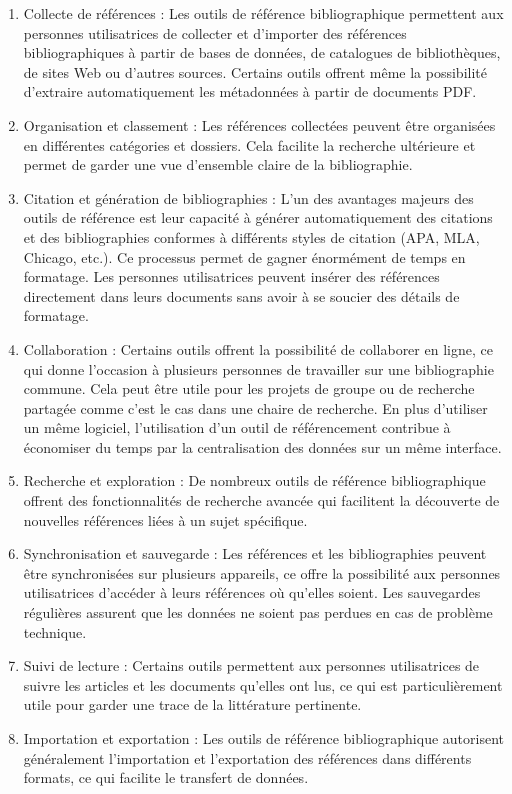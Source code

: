 \documentclass[
  letterpaper,
  DIV=11,
  numbers=noendperiod]{scrreprt}
\begin{document}
\begin{enumerate}
\def\labelenumi{\arabic{enumi}.}
\item
  Collecte de références : Les outils de référence bibliographique
  permettent aux personnes utilisatrices de collecter et d'importer des
  références bibliographiques à partir de bases de données, de
  catalogues de bibliothèques, de sites Web ou d'autres sources.
  Certains outils offrent même la possibilité d'extraire automatiquement
  les métadonnées à partir de documents PDF.
\item
  Organisation et classement : Les références collectées peuvent être
  organisées en différentes catégories et dossiers. Cela facilite la
  recherche ultérieure et permet de garder une vue d'ensemble claire de
  la bibliographie.
\item
  Citation et génération de bibliographies : L'un des avantages majeurs
  des outils de référence est leur capacité à générer automatiquement
  des citations et des bibliographies conformes à différents styles de
  citation (APA, MLA, Chicago, etc.). Ce processus permet de gagner
  énormément de temps en formatage. Les personnes utilisatrices peuvent
  insérer des références directement dans leurs documents sans avoir à
  se soucier des détails de formatage.
\item
  Collaboration : Certains outils offrent la possibilité de collaborer
  en ligne, ce qui donne l'occasion à plusieurs personnes de travailler
  sur une bibliographie commune. Cela peut être utile pour les projets
  de groupe ou de recherche partagée comme c'est le cas dans une chaire
  de recherche. En plus d'utiliser un même logiciel, l'utilisation d'un
  outil de référencement contribue à économiser du temps par la
  centralisation des données sur un même interface.
\item
  Recherche et exploration : De nombreux outils de référence
  bibliographique offrent des fonctionnalités de recherche avancée qui
  facilitent la découverte de nouvelles références liées à un sujet
  spécifique.
\item
  Synchronisation et sauvegarde : Les références et les bibliographies
  peuvent être synchronisées sur plusieurs appareils, ce offre la
  possibilité aux personnes utilisatrices d'accéder à leurs références
  où qu'elles soient. Les sauvegardes régulières assurent que les
  données ne soient pas perdues en cas de problème technique.
\item
  Suivi de lecture : Certains outils permettent aux personnes
  utilisatrices de suivre les articles et les documents qu'elles ont
  lus, ce qui est particulièrement utile pour garder une trace de la
  littérature pertinente.
\item
  Importation et exportation : Les outils de référence bibliographique
  autorisent généralement l'importation et l'exportation des références
  dans différents formats, ce qui facilite le transfert de données.
\end{enumerate}
\end{document}
